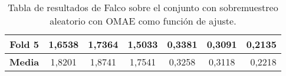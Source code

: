 \begin{table}[H]
{\begin{tabular}{|crrrrrr|}
\multicolumn{1}{|c|}{\textbf{Fold 5}} & \multicolumn{1}{c|}{1,6538}            & \multicolumn{1}{c|}{1,7364}              & \multicolumn{1}{c|}{\textbf{1,5033}} & \multicolumn{1}{c|}{0,3381}            & \multicolumn{1}{c|}{0,3091}              & 0,2135                             \\ \hline
\multicolumn{1}{|c|}{\textbf{Media}}  & \multicolumn{1}{c|}{1,8201}           & \multicolumn{1}{c|}{1,8741}             & \multicolumn{1}{c|}{1,7541}         & \multicolumn{1}{c|}{0,3258}            & \multicolumn{1}{c|}{0,3118}             & 0,2218                            \\ \hline
\end{tabular}%
}
\caption{Tabla de resultados de Falco sobre el conjunto con sobremuestreo aleatorio con OMAE como función de ajuste.}\label{tablaFALCOconOMAE}
\end{table}


